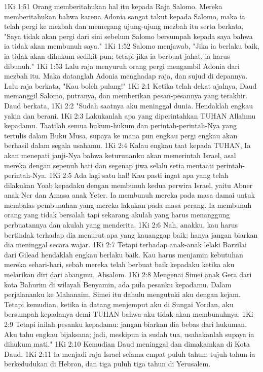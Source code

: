 1Ki 1:51  Orang memberitahukan hal itu kepada Raja Salomo. Mereka memberitahukan bahwa karena Adonia sangat takut kepada Salomo, maka ia telah pergi ke mezbah dan memegang ujung-ujung mezbah itu serta berkata, "Saya tidak akan pergi dari sini sebelum Salomo bersumpah kepada saya bahwa ia tidak akan membunuh saya."
1Ki 1:52  Salomo menjawab, "Jika ia berlaku baik, ia tidak akan dihukum sedikit pun; tetapi jika ia berbuat jahat, ia harus dibunuh."
1Ki 1:53  Lalu raja menyuruh orang pergi mengambil Adonia dari mezbah itu. Maka datanglah Adonia menghadap raja, dan sujud di depannya. Lalu raja berkata, "Kau boleh pulang!"
1Ki 2:1  Ketika telah dekat ajalnya, Daud memanggil Salomo, putranya, dan memberikan pesan-pesannya yang terakhir. Daud berkata,
1Ki 2:2  "Sudah saatnya aku meninggal dunia. Hendaklah engkau yakin dan berani.
1Ki 2:3  Lakukanlah apa yang diperintahkan TUHAN Allahmu kepadamu. Taatilah semua hukum-hukum dan perintah-perintah-Nya yang tertulis dalam Buku Musa, supaya ke mana pun engkau pergi engkau akan berhasil dalam segala usahamu.
1Ki 2:4  Kalau engkau taat kepada TUHAN, Ia akan menepati janji-Nya bahwa keturunanku akan memerintah Israel, asal mereka dengan sepenuh hati dan segenap jiwa selalu setia mentaati perintah-perintah-Nya.
1Ki 2:5  Ada lagi satu hal! Kau pasti ingat apa yang telah dilakukan Yoab kepadaku dengan membunuh kedua perwira Israel, yaitu Abner anak Ner dan Amasa anak Yeter. Ia membunuh mereka pada masa damai untuk membalas pembunuhan yang mereka lakukan pada masa perang. Ia membunuh orang yang tidak bersalah tapi sekarang akulah yang harus menanggung perbuatannya dan akulah yang menderita.
1Ki 2:6  Nah, anakku, kau harus bertindak terhadap dia menurut apa yang kauanggap baik; hanya jangan biarkan dia meninggal secara wajar.
1Ki 2:7  Tetapi terhadap anak-anak lelaki Barzilai dari Gilead hendaklah engkau berlaku baik. Kau harus menjamin kebutuhan mereka sehari-hari, sebab mereka telah berbuat baik kepadaku ketika aku melarikan diri dari abangmu, Absalom.
1Ki 2:8  Mengenai Simei anak Gera dari kota Bahurim di wilayah Benyamin, ada pula pesanku kepadamu. Dalam perjalananku ke Mahanaim, Simei itu dahulu mengutuki aku dengan kejam. Tetapi kemudian, ketika ia datang menjemput aku di Sungai Yordan, aku bersumpah kepadanya demi TUHAN bahwa aku tidak akan membunuhnya.
1Ki 2:9  Tetapi inilah pesanku kepadamu: jangan biarkan dia bebas dari hukuman. Aku tahu engkau bijaksana; jadi, meskipun ia sudah tua, usahakanlah supaya ia dihukum mati."
1Ki 2:10  Kemudian Daud meninggal dan dimakamkan di Kota Daud.
1Ki 2:11  Ia menjadi raja Israel selama empat puluh tahun: tujuh tahun ia berkedudukan di Hebron, dan tiga puluh tiga tahun di Yerusalem.
